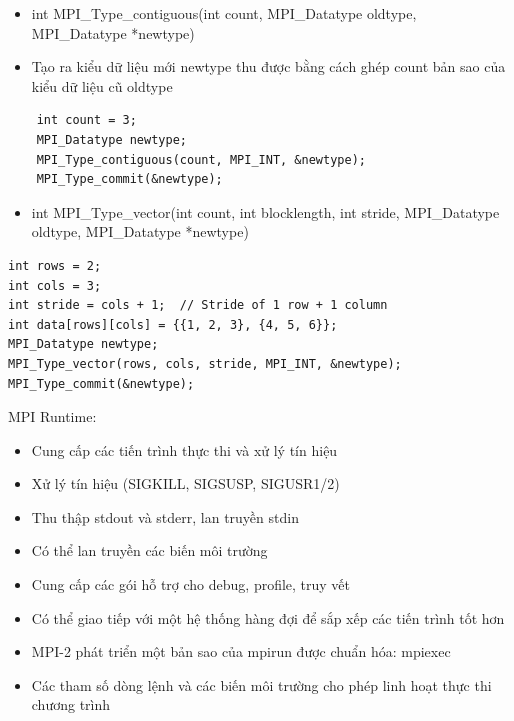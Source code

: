 \documentclass[14pt, a4paper]{article}
\numberwithin{equation}{section}
\numberwithin{figure}{section}
\numberwithin{dl}{section}
\numberwithin{md}{section}
\numberwithin{bd}{section}
\numberwithin{dn}{section}
\numberwithin{hq}{section}
\begin{document}
        \begin{itemize}
            \item int MPI\_Type\_contiguous(int count, MPI\_Datatype oldtype,
                                            MPI\_Datatype *newtype)
            \item Tạo ra kiểu dữ liệu mới newtype thu được bằng cách ghép count bản sao của kiểu dữ liệu cũ oldtype
           
        \end{itemize}
        \begin{verbatim}
    int count = 3;
    MPI_Datatype newtype;
    MPI_Type_contiguous(count, MPI_INT, &newtype);
    MPI_Type_commit(&newtype);
\end{verbatim}

\begin{itemize}
    \item int MPI\_Type\_vector(int count, int blocklength, int stride,
                                MPI\_Datatype oldtype,
                                MPI\_Datatype *newtype)
\end{itemize}

\begin{verbatim}
int rows = 2;
int cols = 3;
int stride = cols + 1;  // Stride of 1 row + 1 column
int data[rows][cols] = {{1, 2, 3}, {4, 5, 6}};
MPI_Datatype newtype;
MPI_Type_vector(rows, cols, stride, MPI_INT, &newtype);
MPI_Type_commit(&newtype);
\end{verbatim}

MPI Runtime:

\begin{itemize}
    \item Cung cấp các tiến trình thực thi và xử lý tín hiệu
    \item Xử lý tín hiệu (SIGKILL, SIGSUSP, SIGUSR1/2)
    \item Thu thập stdout và stderr, lan truyền stdin
    \item Có thể lan truyền các biến môi trường 
    \item Cung cấp các gói hỗ trợ cho debug, profile, truy vết 
    \item Có thể giao tiếp với một hệ thống hàng đợi để sắp xếp các tiến trình tốt hơn
    \item MPI-2 phát triển một bản sao của mpirun được chuẩn hóa: mpiexec
    \item Các tham số dòng lệnh và các biến môi trường cho phép linh hoạt thực thi chương trình
\end{itemize}
\end{document}
